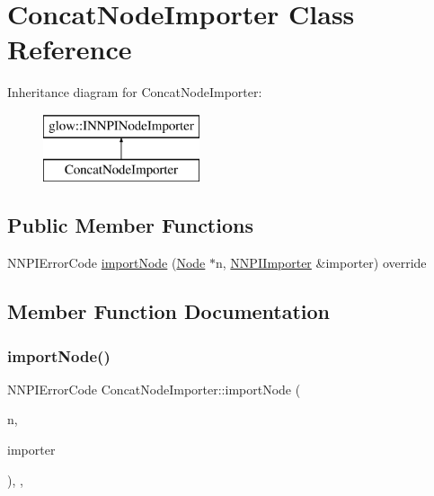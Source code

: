 \hypertarget{class_concat_node_importer}{}\section{Concat\+Node\+Importer Class Reference}
\label{class_concat_node_importer}
Inheritance diagram for Concat\+Node\+Importer\+:\begin{figure}[H]
\begin{center}
\leavevmode
\includegraphics[height=2.000000cm]{class_concat_node_importer}
\end{center}
\end{figure}
\subsection*{Public Member Functions}
\begin{DoxyCompactItemize}
\item 
N\+N\+P\+I\+Error\+Code \hyperlink{class_concat_node_importer_aef4785962f48dc388046314926467aa2}{import\+Node} (\hyperlink{classglow_1_1_node}{Node} $\ast$n, \hyperlink{classglow_1_1_n_n_p_i_importer}{N\+N\+P\+I\+Importer} \&importer) override
\end{DoxyCompactItemize}


\subsection{Member Function Documentation}
\mbox{\label{class_concat_node_importer_aef4785962f48dc388046314926467aa2}} 
\subsubsection{\texorpdfstring{import\+Node()}{importNode()}}
{\footnotesize\ttfamily N\+N\+P\+I\+Error\+Code Concat\+Node\+Importer\+::import\+Node (\begin{DoxyParamCaption}\item[{\hyperlink{classglow_1_1_node}{Node} $\ast$}]{n,  }\item[{\hyperlink{classglow_1_1_n_n_p_i_importer}{N\+N\+P\+I\+Importer} \&}]{importer }\end{DoxyParamCaption})\hspace{0.3cm}{\ttfamily [inline]}, {\ttfamily [override]}, {\ttfamily [virtual]}}

